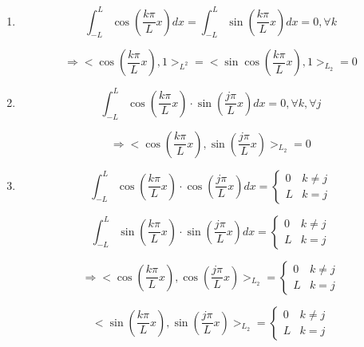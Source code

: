 		\begin{theorem} $ $ %

			\begin{enumerate}[label=(\arabic*)]

				\item
				\[ \int^{L}_{-L} \cos \left( \frac{k \pi}{L} x \right) dx = \int^{L}_{-L} \sin \left( \frac{k \pi}{L} x \right) dx = 0, \forall k \]

				\[\Rightarrow <\cos \left( \frac{k \pi}{L} x \right),1>_{L^2} = < \sin \cos \left( \frac{k \pi}{L} x \right),1>_{L_2} = 0\]

				\item
				\[ \int^{L}_{-L} \cos \left( \frac{k \pi}{L} x \right) \cdot \sin \left( \frac{j \pi}{L} x \right) dx = 0, \forall k, \forall j\]

				\[\Rightarrow < \cos \left( \frac{k \pi}{L} x \right), \sin \left( \frac{j \pi}{L} x \right) >_{L_2} = 0   \]

				\item
				\[ \int^{L}_{-L} \cos \left( \frac{k \pi}{L} x \right) \cdot \cos \left( \frac{j \pi}{L} x \right) dx = \begin{cases}
				0 & k \neq j \\
				L & k = j \end{cases} \]

				\[ \int^{L}_{-L} \sin \left( \frac{k \pi}{L} x \right) \cdot \sin \left( \frac{j \pi}{L} x \right) dx = \begin{cases}
				0 & k \neq j \\
				L & k = j \end{cases} \]

				\[\Rightarrow < \cos \left( \frac{k \pi}{L} x \right), \cos \left( \frac{j \pi}{L} x \right) >_{L_2} = \begin{cases}
				0 & k \neq j \\
				L & k = j \end{cases} \]

				\[ < \sin \left( \frac{k \pi}{L} x \right), \sin \left( \frac{j \pi}{L} x \right) >_{L_2} = \begin{cases}
				0 & k \neq j \\
				L & k = j \end{cases} \]

			\end{enumerate}
		\end{theorem}

